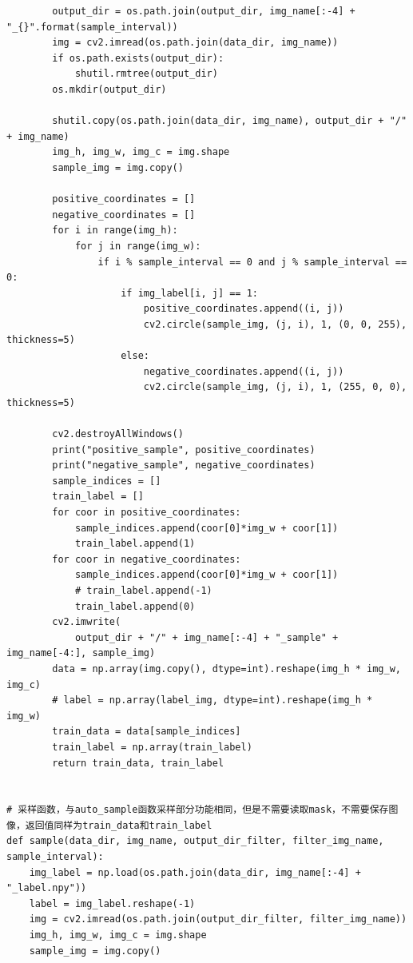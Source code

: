 \documentclass[12pt,hyperref,a4paper,UTF8]{ctexart}
\begin{document}
{{\begin{mdframed}[style=codebox]
\begin{lstlisting}
        output_dir = os.path.join(output_dir, img_name[:-4] + "_{}".format(sample_interval))
        img = cv2.imread(os.path.join(data_dir, img_name))
        if os.path.exists(output_dir):
            shutil.rmtree(output_dir)
        os.mkdir(output_dir)

        shutil.copy(os.path.join(data_dir, img_name), output_dir + "/" + img_name)
        img_h, img_w, img_c = img.shape
        sample_img = img.copy()

        positive_coordinates = []
        negative_coordinates = []
        for i in range(img_h):
            for j in range(img_w):
                if i % sample_interval == 0 and j % sample_interval == 0:
                    if img_label[i, j] == 1:
                        positive_coordinates.append((i, j))
                        cv2.circle(sample_img, (j, i), 1, (0, 0, 255), thickness=5)
                    else:
                        negative_coordinates.append((i, j))
                        cv2.circle(sample_img, (j, i), 1, (255, 0, 0), thickness=5)

        cv2.destroyAllWindows()
        print("positive_sample", positive_coordinates)
        print("negative_sample", negative_coordinates)
        sample_indices = []
        train_label = []
        for coor in positive_coordinates:
            sample_indices.append(coor[0]*img_w + coor[1])
            train_label.append(1)
        for coor in negative_coordinates:
            sample_indices.append(coor[0]*img_w + coor[1])
            # train_label.append(-1)
            train_label.append(0)
        cv2.imwrite(
            output_dir + "/" + img_name[:-4] + "_sample" + img_name[-4:], sample_img)
        data = np.array(img.copy(), dtype=int).reshape(img_h * img_w, img_c)
        # label = np.array(label_img, dtype=int).reshape(img_h * img_w)
        train_data = data[sample_indices]
        train_label = np.array(train_label)
        return train_data, train_label


# 采样函数，与auto_sample函数采样部分功能相同，但是不需要读取mask，不需要保存图像，返回值同样为train_data和train_label
def sample(data_dir, img_name, output_dir_filter, filter_img_name, sample_interval):
    img_label = np.load(os.path.join(data_dir, img_name[:-4] + "_label.npy"))
    label = img_label.reshape(-1)
    img = cv2.imread(os.path.join(output_dir_filter, filter_img_name))
    img_h, img_w, img_c = img.shape
    sample_img = img.copy()


\end{lstlisting}
\end{mdframed}}}
\end{document}
